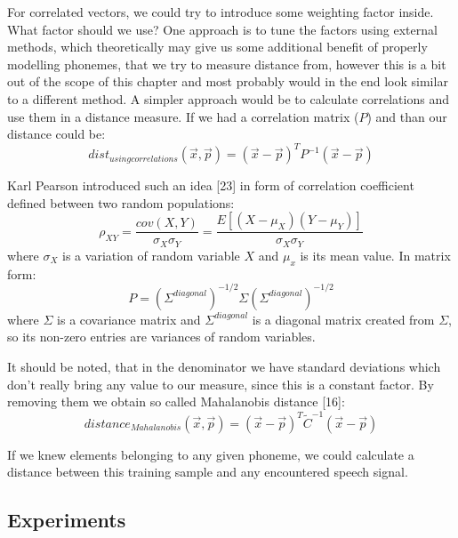 \documentclass[12pt,a4paper,english]{article}
\begin{document}
For correlated vectors, we could try to introduce some weighting factor inside.\newline
What factor should we use?\newline
One approach is to tune the factors using external methods, which theoretically may give us some additional benefit of properly modelling phonemes, that we try to measure distance from, however this is a bit out of the scope of this chapter and most probably would in the end look similar to a different method.
A simpler approach would be to calculate correlations and use them in a distance measure.
If we had a correlation matrix ($P$) and than our distance could be:
\begin{equation}
    dist_{using correlations}(\vec x, \vec p) = (\vec x - \vec p)^T P^{-1} (\vec x - \vec p)
\end{equation}
               
Karl Pearson introduced such an idea [23] in form of correlation coefficient defined between two random populations:  
\begin{equation}
    \rho_{XY} = \frac{cov(X, Y)}{\sigma_X \sigma_Y} = \frac{E[(X - \mu_X)(Y - \mu_Y)]}{\sigma_X \sigma_Y}
\end{equation}
where $\sigma_X$ is a variation of random variable $X$ and $\mu_x$ is its mean value. \newline
In matrix form:  
\begin{equation}
    P = (\Sigma^{diagonal})^{-1/2} \Sigma (\Sigma^{diagonal})^{-1/2}
\end{equation}
where $\Sigma$ is a covariance matrix and $\Sigma^{diagonal}$ is a diagonal matrix created from $\Sigma$,
so its non-zero entries are variances of random variables. \newline

It should be noted, that in the denominator we have standard deviations which don't really bring any value to our measure, since this is a constant factor.
By removing them we obtain so called Mahalanobis distance [16]:
\begin{equation}
    distance_{Mahalanobis}(\vec x, \vec p) = (\vec x - \vec p)^T \tilde C^{-1} (\vec x - \vec p)
\end{equation}

If we knew elements belonging to any given phoneme, we could calculate a distance between this training sample and any encountered speech signal.

\newpage
\newpage
\subsection{Experiments}
\end{document}
